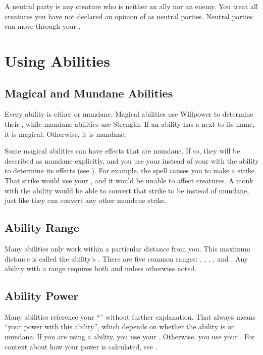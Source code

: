      A neutral party is any creature who is neither an ally nor an enemy.
    You treat all creatures you have not declared an opinion of as neutral parties.
    Neutral parties can move through your .

\section{Using Abilities}\label{Using Abilities}

  \subsection{Magical and Mundane Abilities}\label{Magical and Mundane Abilities}
    Every ability is either \magical or mundane.
    Magical abilities use Willpower to determine their , while mundane abilities use Strength.
    If an ability has a \sparkle{} next to its name, it is magical.
    Otherwise, it is mundane.

    Some magical abilities can have effects that are mundane.
    If so, they will be described as mundane explicitly, and you use your  instead of your  with the ability to determine its effects (see ).
    For example, the  spell causes you to make a  strike.
    That strike would use your , and it would be unable to affect  creatures.
    A monk with the  ability would be able to convert that strike to be \magical instead of mundane, just like they can convert any other mundane strike.

  \subsection{Ability Range}\label{Ability Range}
    Many abilities only work within a particular distance from you.
    This maximum distance is called the ability's .
    There are five common ranges: \shortrange, \medrange, \longrange, \distrange, and \extrange.
    Any ability with a range requires both  and  unless otherwise noted.

  \subsection{Ability Power}\label{Ability Power}
    Many abilities reference your ``'' without further explanation.
    That always means ``your power with this ability'', which depends on whether the ability is \magical or mundane.
    If you are using a \magical ability, you use your .
    Otherwise, you use your .
    For context about how your power is calculated, see .

